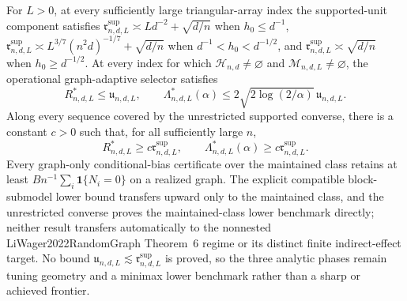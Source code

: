 For \(L>0\), at every sufficiently large triangular-array index the supported-unit component satisfies \(\mathfrak r^{\mathrm{sup}}_{n,d,L}\asymp Ld^{-2}+\sqrt{d/n}\) when \(h_0\leq d^{-1}\), \(\mathfrak r^{\mathrm{sup}}_{n,d,L}\asymp L^{3/7}(n^2d)^{-1/7}+\sqrt{d/n}\) when \(d^{-1}<h_0<d^{-1/2}\), and \(\mathfrak r^{\mathrm{sup}}_{n,d,L}\asymp\sqrt{d/n}\) when \(h_0\geq d^{-1/2}\).  At every index for which \(\mathcal H_{n,d}\ne\varnothing\) and \(\mathcal M_{n,d,L}\ne\varnothing\), the operational graph-adaptive selector satisfies
\[
 R^*_{n,d,L}\leq\mathfrak u_{n,d,L},
 \qquad
 \Lambda^*_{n,d,L}(\alpha)
 \leq2\sqrt{2\log(2/\alpha)}\,\mathfrak u_{n,d,L}.
\]
Along every sequence covered by the unrestricted supported converse, there is a constant \(c>0\) such that, for all sufficiently large \(n\),
\[
 R^*_{n,d,L}\geq c\mathfrak r^{\mathrm{sup}}_{n,d,L},
 \qquad
 \Lambda^*_{n,d,L}(\alpha)\geq c\mathfrak r^{\mathrm{sup}}_{n,d,L}.
\]
Every graph-only conditional-bias certificate over the maintained class retains at least \(Bn^{-1}\sum_i\mathbf1\{N_i=0\}\) on a realized graph.  The explicit compatible block-submodel lower bound transfers upward only to the maintained class, and the unrestricted converse proves the maintained-class lower benchmark directly; neither result transfers automatically to the nonnested LiWager2022RandomGraph Theorem~6 regime or its distinct finite indirect-effect target.  No bound \(\mathfrak u_{n,d,L}\lesssim\mathfrak r^{\mathrm{sup}}_{n,d,L}\) is proved, so the three analytic phases remain tuning geometry and a minimax lower benchmark rather than a sharp or achieved frontier.